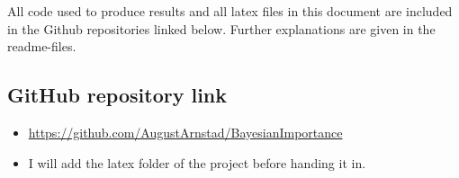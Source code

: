 

All code used to produce results and all latex files in this document are included in the Github repositories linked below. Further explanations are given in the readme-files. 
\subsection*{GitHub repository link}
\begin{itemize}
    \item \url{https://github.com/AugustArnstad/BayesianImportance}
    \item I will add the latex folder of the project before handing it in.
\end{itemize}

